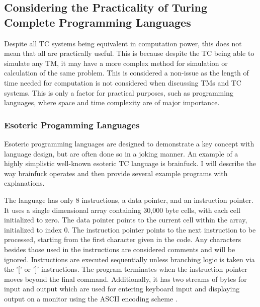 \subsection{Considering the Practicality of Turing Complete Programming Languages}\label{subsec:PracticalTC}

Despite all TC systems being equivalent in computation power, this does not mean that all are practically useful.
This is because despite the TC being able to simulate any TM, it may have a more complex method for simulation or calculation of the same problem.
This is considered a non-issue as the length of time needed for computation is not considered when discussing TMs and TC systems.
This is only a factor for practical purposes, such as programming languages, where space and time complexity are of major importance.

\subsubsection{Esoteric Progamming Languages}\label{subsubsec:EsotericPL}

Esoteric programming languages are designed to demonstrate a key concept with language design, but are often done so in a joking manner.
An example of a highly simplistic well-known esoteric TC language is brainfuck.
I will describe the way brainfuck operates and then provide several example programs with explanations.

The language has only 8 instructions, a data pointer, and an instruction pointer.
It uses a single dimensional array containing 30,000 byte cells, with each cell initialized to zero.
The data pointer points to the current cell within the array, initialized to index 0.
The instruction pointer points to the next instruction to be processed, starting from the first character given in the code.
Any characters besides those used in the instructions are considered comments and will be ignored.
Instructions are executed sequentially unless branching logic is taken via the '[' or ']' instructions.
The program terminates when the instruction pointer moves beyond the final command.
Additionally, it has two streams of bytes for input and output which are used for entering keyboard input and displaying output on a monitor using the ASCII encoding scheme \cite{BfWiki,BfGH}.

